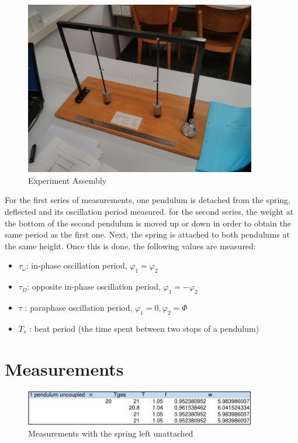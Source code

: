 \documentclass{scrreprt}
\renewcommand{\phi}{\varphi}
\begin{document}
\begin{figure}[H]
	\centering
  \includegraphics[width=0.9\textwidth]{img/assembly.jpg}
	\caption{Experiment Assembly}
	\label{fig:assembly}
\end{figure}
For the first series of measurements, one pendulum is detached from the spring, deflected and its oscillation period measured. for the second series, the weight at the bottom of the second pendulum is moved up or down in order to obtain the same period as the first one. Next, the spring is attached to both pendulums at the same height. Once this is done, the following values are measured:
\begin{itemize}
\item $\tau_{\omega}$: in-phase oscillation period, $\phi_1 = \phi_2$
\item $\tau_{\Omega}$: opposite in-phase oscillation period, $\phi_1 = -\phi_2$
\item $\tau$ : paraphase oscillation period, $\phi_1 = 0, \phi_2 = \Phi$
\item $T_s$ : beat period (the time spent between two stops of a pendulum)
\end{itemize}
\section{Measurements}

\begin{figure}[H]
	\centering
  \includegraphics[width=0.9\textwidth]{diag/uncoupled.pdf}
	\caption{Measurements with the spring left unattached}
	\label{fig:uncoupled}
\end{figure}
\end{document}
